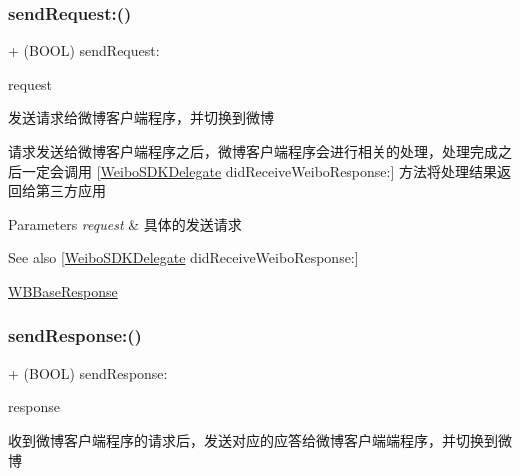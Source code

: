 \subsubsection{\texorpdfstring{send\+Request\+:()}{sendRequest:()}\hspace{0.1cm}{\footnotesize\ttfamily [3/3]}}
{\footnotesize\ttfamily + (B\+O\+OL) send\+Request\+: \begin{DoxyParamCaption}\item[{(\mbox{\hyperlink{interface_w_b_base_request}{W\+B\+Base\+Request}} $\ast$)}]{request }\end{DoxyParamCaption}}

发送请求给微博客户端程序，并切换到微博

请求发送给微博客户端程序之后，微博客户端程序会进行相关的处理，处理完成之后一定会调用 \mbox{[}\mbox{\hyperlink{class_weibo_s_d_k_delegate-p}{Weibo\+S\+D\+K\+Delegate}} did\+Receive\+Weibo\+Response\+:\mbox{]} 方法将处理结果返回给第三方应用


\begin{DoxyParams}{Parameters}
{\em request} & 具体的发送请求\\
\hline
\end{DoxyParams}
\begin{DoxySeeAlso}{See also}
\mbox{[}\mbox{\hyperlink{class_weibo_s_d_k_delegate-p}{Weibo\+S\+D\+K\+Delegate}} did\+Receive\+Weibo\+Response\+:\mbox{]} 

\mbox{\hyperlink{interface_w_b_base_response}{W\+B\+Base\+Response}} 
\end{DoxySeeAlso}
\mbox{\label{interface_weibo_s_d_k_af0a51ae27b64cf65bba05a1ea9c5d6e5}} 
\subsubsection{\texorpdfstring{send\+Response\+:()}{sendResponse:()}\hspace{0.1cm}{\footnotesize\ttfamily [1/3]}}
{\footnotesize\ttfamily + (B\+O\+OL) send\+Response\+: \begin{DoxyParamCaption}\item[{(\mbox{\hyperlink{interface_w_b_base_response}{W\+B\+Base\+Response}} $\ast$)}]{response }\end{DoxyParamCaption}}

收到微博客户端程序的请求后，发送对应的应答给微博客户端端程序，并切换到微博

